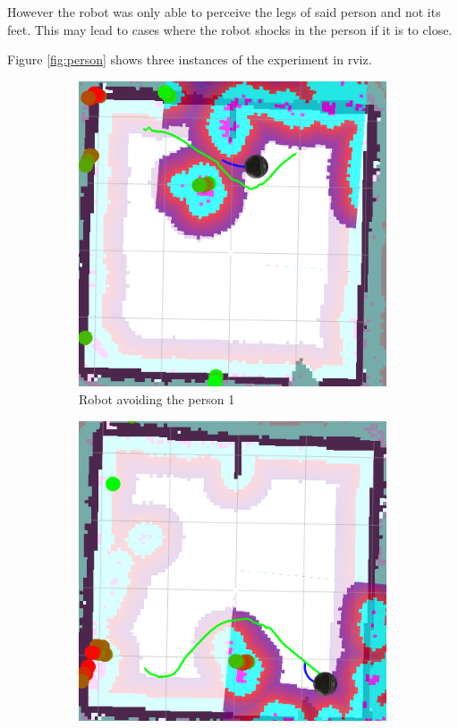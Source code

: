 However the robot was only able to perceive the legs of said person and not its feet. This may lead to cases where the robot shocks in the person if it is to close.

Figure \ref{fig:person} shows three instances of the experiment in rviz.
\begin{figure}[ht!]
  \centering
  \begin{subfigure}[t]{0.3\linewidth}
    \includegraphics[width=\linewidth]{imgs/chapter5/person1.png}
     \caption{Robot avoiding the person 1}
     \label{fig::person1}
  \end{subfigure}
  \begin{subfigure}[t]{0.3\linewidth}
    \includegraphics[width=\linewidth]{imgs/chapter5/person2.png}

\end{subfigure}
\end{figure}

